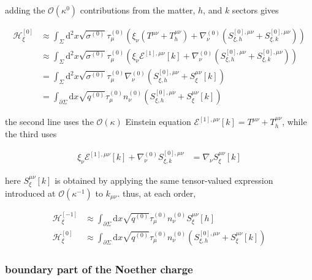 adding the $\displaystyle{\mathcal{O}(\kappa ^{0})}$ contributions from the matter, $\displaystyle{h}$, and $\displaystyle{k}$ sectors gives

\begin{align}
\mathcal{H}^{[0]}_{\xi} & \approx\int _{\Sigma}\mathrm{d}^{2}x\sqrt{ \sigma ^{(0)} }\tau _{\mu}^{(0)}\left(\xi _{\nu}(T^{\mu \nu}+T_{h}^{\mu \nu})+\nabla ^{(0)}_{\nu}(S_{\xi,h}^{[0],\mu \nu}+S_{\xi,k}^{[0],\mu \nu})\right) \\
 & \approx\int _{\Sigma}\mathrm{d}^{2}x\sqrt{ \sigma ^{(0)} }\tau _{\mu}^{(0)}\left(\xi _{\nu}\mathcal{E}^{[1],\mu \nu}[k]+\nabla _{\nu}^{(0)}(S_{\xi,h}^{[0],\mu \nu}+S_{\xi,k}^{[0],\mu \nu})\right) \\
 & =\int _{\Sigma}\mathrm{d}^{2}x\sqrt{ \sigma ^{(0)} }\tau _{\mu}^{(0)}\nabla _{\nu}^{(0)}(S_{\xi,h}^{[0],\mu \nu}+S_{\xi}^{\mu \nu}[k]) \\
 & =\int _{\partial \Sigma}\mathrm{d}x\sqrt{ q^{(0)} }\tau _{\mu}^{(0)}n_{\nu}^{(0)}(S_{\xi,h}^{[0],\mu \nu}+S_{\xi}^{\mu \nu}[k])
\end{align}

the second line uses the $\displaystyle{\mathcal{O}(\kappa)}$ Einstein equation $\displaystyle{\mathcal{E}^{[1],\mu \nu}[k]=T^{\mu \nu}+T_{h}^{\mu \nu}}$, while the third uses

\begin{align}
\xi _{\nu}\mathcal{E}^{[1],\mu \nu}[k]+\nabla ^{(0)}_{\nu}S_{\xi,k}^{[0],\mu \nu} & =\nabla _{\nu}S_{\xi}^{\mu \nu}[k]
\end{align}

here $\displaystyle{S_{\xi}^{\mu \nu}[k]}$ is obtained by applying the same tensor-valued expression introduced at $\displaystyle{\mathcal{O}(\kappa ^{-1})}$ to $\displaystyle{k_{\mu\nu}}$. thus, at each order,

\begin{align}
\mathcal{H}_{\xi}^{[-1]} & \approx\int _{\partial \Sigma}\mathrm{d}x\sqrt{ q^{(0)} }\tau _{\mu}^{(0)}n_{\nu}^{(0)}S_{\xi}^{\mu \nu}[h] \\
\mathcal{H}_{\xi}^{[0]} & \approx\int _{\partial \Sigma}\mathrm{d}x\sqrt{ q^{(0)} }\tau _{\mu}^{(0)}n_{\nu}^{(0)}(S_{\xi,h}^{[0],\mu \nu}+S_{\xi}^{\mu \nu}[k])
\end{align}

\subsubsection{boundary part of the Noether charge}\label{subsubsec:boundary-noether-charge}

